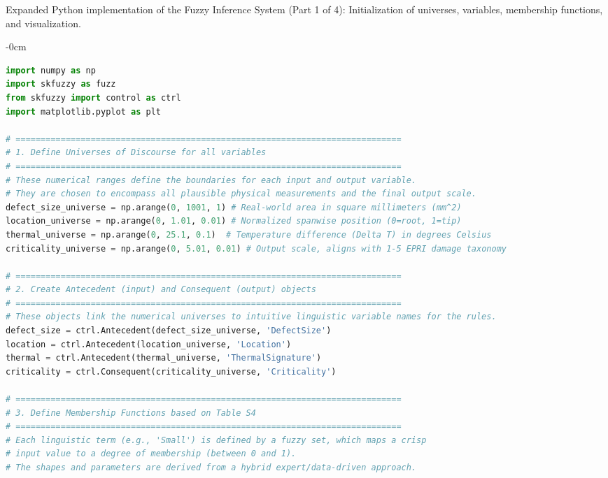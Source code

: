 \documentclass[energies,supfile,submit,pdftex,moreauthors]{Definitions/mdpi}
\begin{document}



\begin{listing}[H]
\caption{Expanded Python implementation of the Fuzzy Inference System (Part 1 of 4): Initialization of universes, variables, membership functions, and visualization.}
\label{lst:scikit-code-part1}
\begin{adjustwidth}{-\extralength}{0cm}
\begin{lstlisting}[language=Python, style=mystyle]
import numpy as np
import skfuzzy as fuzz
from skfuzzy import control as ctrl
import matplotlib.pyplot as plt

# =============================================================================
# 1. Define Universes of Discourse for all variables
# =============================================================================
# These numerical ranges define the boundaries for each input and output variable.
# They are chosen to encompass all plausible physical measurements and the final output scale.
defect_size_universe = np.arange(0, 1001, 1) # Real-world area in square millimeters (mm^2)
location_universe = np.arange(0, 1.01, 0.01) # Normalized spanwise position (0=root, 1=tip)
thermal_universe = np.arange(0, 25.1, 0.1)  # Temperature difference (Delta T) in degrees Celsius
criticality_universe = np.arange(0, 5.01, 0.01) # Output scale, aligns with 1-5 EPRI damage taxonomy

# =============================================================================
# 2. Create Antecedent (input) and Consequent (output) objects
# =============================================================================
# These objects link the numerical universes to intuitive linguistic variable names for the rules.
defect_size = ctrl.Antecedent(defect_size_universe, 'DefectSize')
location = ctrl.Antecedent(location_universe, 'Location')
thermal = ctrl.Antecedent(thermal_universe, 'ThermalSignature')
criticality = ctrl.Consequent(criticality_universe, 'Criticality')

# =============================================================================
# 3. Define Membership Functions based on Table S4
# =============================================================================
# Each linguistic term (e.g., 'Small') is defined by a fuzzy set, which maps a crisp
# input value to a degree of membership (between 0 and 1).
# The shapes and parameters are derived from a hybrid expert/data-driven approach.


\end{lstlisting}
\end{adjustwidth}
\end{listing}
\end{document}
